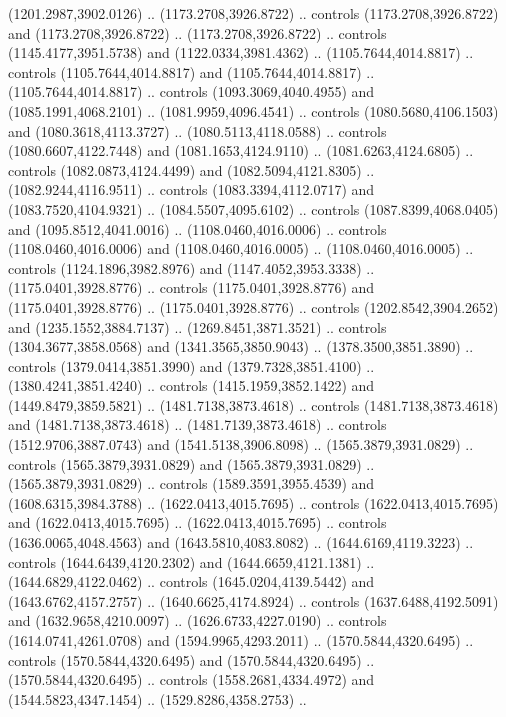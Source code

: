 \begin{scope}[shift={(-343.28256,-575.56596)}]
\begin{scope}[shift={(-736.04956,-3272.8657)}]
      (1201.2987,3902.0126) .. (1173.2708,3926.8722) .. controls
      (1173.2708,3926.8722) and (1173.2708,3926.8722) .. (1173.2708,3926.8722) ..
      controls (1145.4177,3951.5738) and (1122.0334,3981.4362) ..
      (1105.7644,4014.8817) .. controls (1105.7644,4014.8817) and
      (1105.7644,4014.8817) .. (1105.7644,4014.8817) .. controls
      (1093.3069,4040.4955) and (1085.1991,4068.2101) .. (1081.9959,4096.4541) ..
      controls (1080.5680,4106.1503) and (1080.3618,4113.3727) ..
      (1080.5113,4118.0588) .. controls (1080.6607,4122.7448) and
      (1081.1653,4124.9110) .. (1081.6263,4124.6805) .. controls
      (1082.0873,4124.4499) and (1082.5094,4121.8305) .. (1082.9244,4116.9511) ..
      controls (1083.3394,4112.0717) and (1083.7520,4104.9321) ..
      (1084.5507,4095.6102) .. controls (1087.8399,4068.0405) and
      (1095.8512,4041.0016) .. (1108.0460,4016.0006) .. controls
      (1108.0460,4016.0006) and (1108.0460,4016.0005) .. (1108.0460,4016.0005) ..
      controls (1124.1896,3982.8976) and (1147.4052,3953.3338) ..
      (1175.0401,3928.8776) .. controls (1175.0401,3928.8776) and
      (1175.0401,3928.8776) .. (1175.0401,3928.8776) .. controls
      (1202.8542,3904.2652) and (1235.1552,3884.7137) .. (1269.8451,3871.3521) ..
      controls (1304.3677,3858.0568) and (1341.3565,3850.9043) ..
      (1378.3500,3851.3890) .. controls (1379.0414,3851.3990) and
      (1379.7328,3851.4100) .. (1380.4241,3851.4240) .. controls
      (1415.1959,3852.1422) and (1449.8479,3859.5821) .. (1481.7138,3873.4618) ..
      controls (1481.7138,3873.4618) and (1481.7138,3873.4618) ..
      (1481.7139,3873.4618) .. controls (1512.9706,3887.0743) and
      (1541.5138,3906.8098) .. (1565.3879,3931.0829) .. controls
      (1565.3879,3931.0829) and (1565.3879,3931.0829) .. (1565.3879,3931.0829) ..
      controls (1589.3591,3955.4539) and (1608.6315,3984.3788) ..
      (1622.0413,4015.7695) .. controls (1622.0413,4015.7695) and
      (1622.0413,4015.7695) .. (1622.0413,4015.7695) .. controls
      (1636.0065,4048.4563) and (1643.5810,4083.8082) .. (1644.6169,4119.3223) ..
      controls (1644.6439,4120.2302) and (1644.6659,4121.1381) ..
      (1644.6829,4122.0462) .. controls (1645.0204,4139.5442) and
      (1643.6762,4157.2757) .. (1640.6625,4174.8924) .. controls
      (1637.6488,4192.5091) and (1632.9658,4210.0097) .. (1626.6733,4227.0190) ..
      controls (1614.0741,4261.0708) and (1594.9965,4293.2011) ..
      (1570.5844,4320.6495) .. controls (1570.5844,4320.6495) and
      (1570.5844,4320.6495) .. (1570.5844,4320.6495) .. controls
      (1558.2681,4334.4972) and (1544.5823,4347.1454) .. (1529.8286,4358.2753) ..

\end{scope}
\end{scope}
